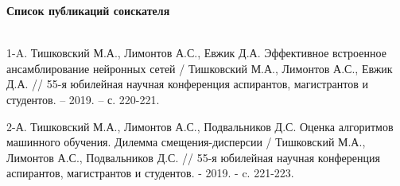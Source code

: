 \renewcommand{\bibsection}{\sectioncentered*{Библиографический список}\\
\textbf{\large Список использованных источников}}
\pagebreak %



\hfill

\textbf{\large Список публикаций соискателя}
\\

1-A. Тишковский М.А., Лимонтов А.С., Евжик Д.А. Эффективное встроенное ансамблирование нейронных сетей / Тишковский М.А., Лимонтов А.С., Евжик Д.А. // 55-я юбилейная научная конференция аспирантов, магистрантов и студентов. – 2019. – с. 220-221.

2-А. Тишковский М.А., Лимонтов А.С., Подвальников Д.С. Оценка алгоритмов машинного обучения. Дилемма смещения-дисперсии / Тишковский М.А., Лимонтов А.С., Подвальников Д.С. // 55-я юбилейная научная конференция аспирантов, магистрантов и студентов. - 2019. - c. 221-223.

\newpage
